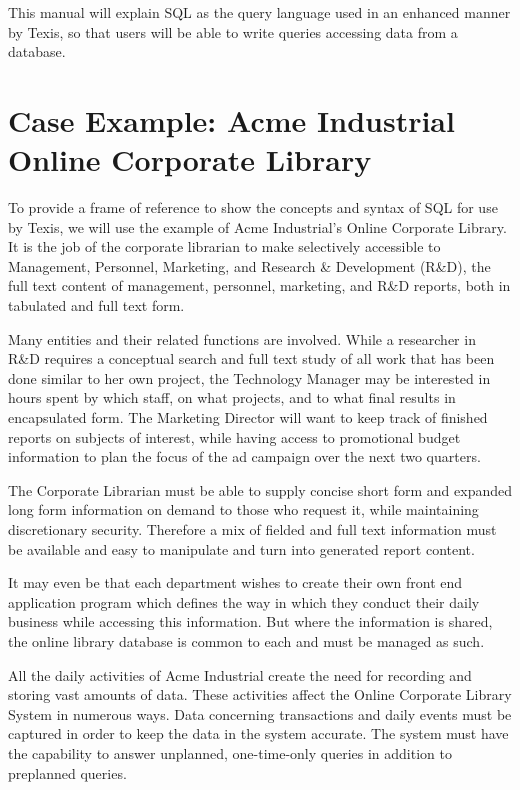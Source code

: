 This manual will explain SQL as the query language used in an enhanced
manner by Texis, so that users will be able to write queries accessing
data from a database.

\section{Case Example: Acme Industrial Online Corporate Library}

To provide a frame of reference to show the concepts and syntax of SQL
for use by Texis, we will use the example of Acme Industrial's Online
Corporate Library.  It is the job of the corporate librarian to make
selectively accessible to Management, Personnel, Marketing, and
Research \& Development (R\&D), the full text content of management,
personnel, marketing, and R\&D reports, both in tabulated and full
text form.

Many entities and their related functions are involved.  While a
researcher in R\&D requires a conceptual search and full text study of
all work that has been done similar to her own project, the Technology
Manager may be interested in hours spent by which staff, on what
projects, and to what final results in encapsulated form.  The
Marketing Director will want to keep track of finished reports on
subjects of interest, while having access to promotional budget
information to plan the focus of the ad campaign over the next two
quarters.

The Corporate Librarian must be able to supply concise short form and
expanded long form information on demand to those who request it,
while maintaining discretionary security.  Therefore a mix of fielded
and full text information must be available and easy to manipulate and
turn into generated report content.

It may even be that each department wishes to create their own front
end application program which defines the way in which they conduct
their daily business while accessing this information.  But where the
information is shared, the online library database is common to each
and must be managed as such.

All the daily activities of Acme Industrial create the need for
recording and storing vast amounts of data.  These activities affect
the Online Corporate Library System in numerous ways.  Data concerning
transactions and daily events must be captured in order to keep the
data in the system accurate.  The system must have the capability to
answer unplanned, one-time-only queries in addition to preplanned
queries.


